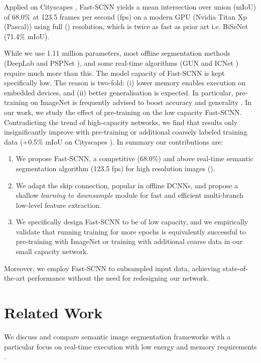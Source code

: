 \documentclass[10pt,twocolumn,letterpaper]{article}
\begin{document}
Applied on Cityscapes \cite{cityscaples2016}, Fast-SCNN yields a mean intersection over union (mIoU) of 68.0\% at 123.5 frames per second (fps) on a modern GPU (Nvidia Titan Xp (Pascal)) using full () resolution, which is twice as fast as prior art i.e. BiSeNet (71.4\% mIoU)\cite{BiSeNet-yu2018}.

While we use 1.11 million parameters, most offline segmentation methods (\eg DeepLab \cite{deeplab-v2-chen2016} and PSPNet \cite{pspnet-zhao2017a}), and some real-time algorithms (\eg GUN \cite{gun-mazzini2018} and ICNet \cite{icnet-zhao2017b}) require much more than this. The model capacity of Fast-SCNN is kept specifically low. The reason is two-fold: (i) lower memory enables execution on embedded devices, and (ii) better generalisation is expected. In particular, pre-training on ImageNet \cite{imagenet2015} is frequently advised to boost accuracy and generality \cite{pspnet-zhao2017a}. In our work, we study the effect of pre-training on the low capacity Fast-SCNN. Contradicting the trend of high-capacity networks, we find that results only insignificantly improve with pre-training or additional coarsely labeled training data (+0.5\% mIoU on Cityscapes \cite{cityscaples2016}). In summary our contributions are:
\begin{enumerate}
\item We propose Fast-SCNN, a competitive (68.0\%) and above real-time semantic segmentation algorithm (123.5 fps) for high resolution images ().
\item We adapt the skip connection, popular in offline DCNNs, and propose a shallow \textit{learning to downsample} module for fast and efficient multi-branch low-level feature extraction.
\item We specifically design Fast-SCNN to be of low capacity, and we empirically validate that running training for more epochs is equivalently successful  to pre-training with ImageNet or training with additional coarse data in our small capacity network.
\end{enumerate}
Moreover, we employ Fast-SCNN to subsampled input data, achieving state-of-the-art performance without the need for redesigning our network.


\section{Related Work}
\label{sec:related-work}
We discuss and compare semantic image segmentation frameworks with a particular focus on real-time execution with low energy and memory requirements \cite{segnet-badrinarayanan2017,enet-paszke2016,contextnet-poudel2018,icnet-zhao2017b,BiSeNet-yu2018,gun-mazzini2018,erfnet-romera2018,espnet-mehta2018}.
\end{document}
